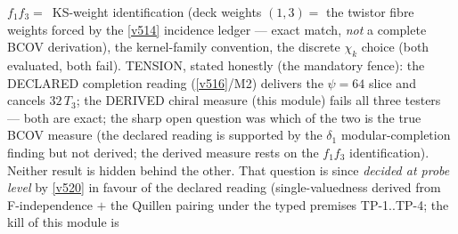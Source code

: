 $f_1f_3=$~KS-weight identification (deck weights $(1,3)=$ the twistor fibre weights forced by
the \vref{v514} incidence ledger --- exact match, \emph{not} a complete BCOV derivation), the
kernel-family convention, the discrete $\chi_k$ choice (both evaluated, both fail).
TENSION, stated honestly (the mandatory fence): the DECLARED completion reading (\vref{v516}/M2)
delivers the $\psi=64$ slice and cancels $32\,T_3$; the DERIVED chiral measure (this module)
fails all three testers --- both are exact; the sharp open question was which of the two is the
true BCOV measure (the declared reading is supported by the $\delta_1$ modular-completion
finding but not derived; the derived measure rests on the $f_1f_3$ identification). Neither
result is hidden behind the other. That question is since \emph{decided at probe level} by
\vref{v520} in favour of the declared reading (single-valuedness derived from F-independence
$+$ the Quillen pairing under the typed premises TP-1..TP-4; the kill of this module is

